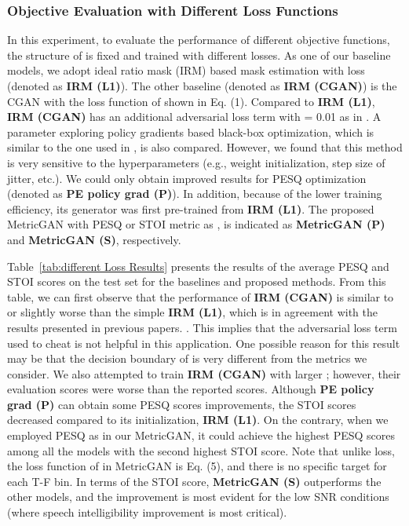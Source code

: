 \documentclass{article}
\begin{document}
\subsubsection{Objective Evaluation with Different Loss Functions}
In this experiment, to evaluate the performance of different objective functions, the structure of  is fixed and trained with different losses. As one of our baseline models, we adopt ideal ratio mask (IRM) \cite{narayanan2013ideal} based mask estimation with  loss (denoted as \textbf{IRM (L1)}). The other baseline (denoted as \textbf{IRM (CGAN)}) is the CGAN with the loss function of  shown in Eq. (1). Compared to \textbf{IRM (L1)}, \textbf{IRM (CGAN)} has an additional adversarial loss term with  = 0.01 as in \cite{bagchi2018spectral,pascual2017segan}. A parameter exploring policy gradients \cite{sehnke2010parameter} based black-box optimization, which is similar to the one used in \cite{zhang2018training}, is also compared. However, we found that this method is very sensitive to the hyperparameters (e.g., weight initialization, step size of jitter, etc.). We could only obtain improved results for PESQ optimization (denoted as \textbf{PE policy grad (P)}). In addition, because of the lower training efficiency, its generator was first pre-trained from \textbf{IRM (L1)}. The proposed MetricGAN with PESQ or STOI metric as , is indicated as \textbf{MetricGAN (P)} and \textbf{MetricGAN (S)}, respectively.




Table~\ref{tab:different Loss Results} presents the results of the average PESQ and STOI scores on the test set for the baselines and proposed methods. From this table, we can first observe that the performance of \textbf{IRM (CGAN)} is similar to or slightly worse than the simple \textbf{IRM (L1)}, which is in agreement with the results presented in previous papers.
\cite{pandey2018adversarial,donahue2018exploring}. This implies that the adversarial loss term used to cheat  is not helpful in this application. One possible reason for this result may be that the decision boundary of  is very different from the metrics we consider. We also attempted to train \textbf{IRM (CGAN)} with larger ; however, their evaluation scores were worse than the reported scores. Although \textbf{PE policy grad (P)} can obtain some PESQ scores improvements, the STOI scores decreased compared to its initialization, \textbf{IRM (L1)}. On the contrary, when we employed PESQ as  in our MetricGAN, it could achieve the highest PESQ scores among all the models with the second highest STOI score. Note that unlike  loss, the loss function of  in MetricGAN is Eq. (5), and there is no specific target for each T-F bin. In terms of the STOI score, \textbf{MetricGAN (S)} outperforms the other models, and the improvement is most evident for the low SNR conditions (where speech intelligibility improvement is most critical).
\end{document}
